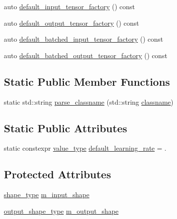 \begin{DoxyCompactItemize}
\item 
auto \hyperlink{structbc_1_1nn_1_1Layer__Base_a93722bcd7c45ba6957645585fabab1f0}{default\+\_\+input\+\_\+tensor\+\_\+factory} () const
\item 
auto \hyperlink{structbc_1_1nn_1_1Layer__Base_ad68e49c1f7a7b81c0ba5ac3537126414}{default\+\_\+output\+\_\+tensor\+\_\+factory} () const
\item 
auto \hyperlink{structbc_1_1nn_1_1Layer__Base_a08bbf8b1b22ebc0e0f7e848a87b5d2db}{default\+\_\+batched\+\_\+input\+\_\+tensor\+\_\+factory} () const
\item 
auto \hyperlink{structbc_1_1nn_1_1Layer__Base_a5d2f35ca3f66bc5606751c9c4e45f3df}{default\+\_\+batched\+\_\+output\+\_\+tensor\+\_\+factory} () const
\end{DoxyCompactItemize}
\subsection*{Static Public Member Functions}
\begin{DoxyCompactItemize}
\item 
static std\+::string \hyperlink{structbc_1_1nn_1_1Layer__Base_a1a046bb75106966abd0e0d02bfec7e16}{parse\+\_\+classname} (std\+::string \hyperlink{structbc_1_1nn_1_1Layer__Base_a3cae4e4c7061a12bb494886dc809c33b}{classname})
\end{DoxyCompactItemize}
\subsection*{Static Public Attributes}
\begin{DoxyCompactItemize}
\item 
static constexpr \hyperlink{structbc_1_1nn_1_1Layer__Base_a64df0ea9c50a4d6dcf59483cc797c393}{value\+\_\+type} \hyperlink{structbc_1_1nn_1_1Layer__Base_ac881324fe78f193bad68502be3640aa7}{default\+\_\+learning\+\_\+rate} = .
\end{DoxyCompactItemize}
\subsection*{Protected Attributes}
\begin{DoxyCompactItemize}
\item 
\hyperlink{structbc_1_1nn_1_1Layer__Base_ab8cbdaad20a0270b2555a91676a79932}{shape\+\_\+type} \hyperlink{structbc_1_1nn_1_1Layer__Base_a177f9c08a4c38718cbfca7aac0df6d3f}{m\+\_\+input\+\_\+shape}
\item 
\hyperlink{structbc_1_1nn_1_1Layer__Output__Base_aa627047014ee5dff2b9cc1804c791815}{output\+\_\+shape\+\_\+type} \hyperlink{structbc_1_1nn_1_1Layer__Base_a01fc8358f70fd47ac93f87b437156da0}{m\+\_\+output\+\_\+shape}
\end{DoxyCompactItemize}


